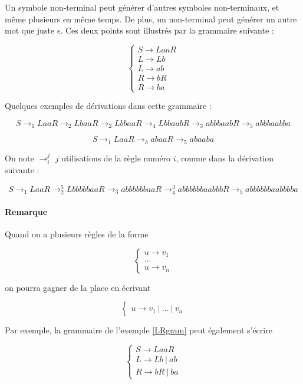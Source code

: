 \begin{example}
\label{LRgram}
Un symbole non-terminal peut générer d'autres symboles non-terminaux, et même plusieurs en même temps. De plus, un non-terminal peut générer un autre mot que juste $\epsilon$. Ces deux points sont illustrés par la grammaire suivante :

\[
\begin{cases}
S \rightarrow LaaR \\
L \rightarrow Lb \\
L \rightarrow ab \\
R \rightarrow bR \\
R \rightarrow ba
\end{cases}
\]

Quelques exemples de dérivations dans cette grammaire :

\[
 S \rightarrow_1 LaaR \rightarrow_2 LbaaR \rightarrow_2 LbbaaR \rightarrow_4 LbbaabR \rightarrow_3 abbbaabR \rightarrow_5 abbbaabba
\]

\[
 S \rightarrow_1 LaaR \rightarrow_3 abaaR \rightarrow_5 abaaba
 \]
 
 On note $\rightarrow_i^j$ $j$ utilisations de la règle numéro $i$, comme dans la dérivation suivante :
 
 \[
 S \rightarrow_1 LaaR \rightarrow_2^5 LbbbbbaaR \rightarrow_3 abbbbbbaaR \rightarrow_4^3 abbbbbbaabbbR \rightarrow_5 abbbbbbaabbbba
 \]

\end{example}

\paragraph{Remarque} Quand on a plusieurs règles de la forme

\[
\begin{cases}
u \rightarrow v_1 \\
... \\
u \rightarrow v_n
\end{cases}
\]

on pourra gagner de la place en écrivant 

\[
\begin{cases}
u \rightarrow v_1~|~...~|~v_n
\end{cases}
\]

Par exemple, la grammaire de l'exemple \ref{LRgram} peut également s'écrire 

\[
\begin{cases}
S \rightarrow LaaR \\
L \rightarrow Lb~|~ab \\
R \rightarrow bR~|~ba 
\end{cases}
\]


